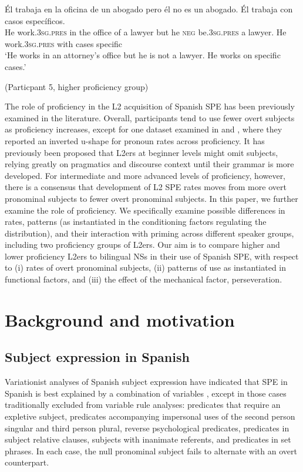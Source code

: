 \documentclass[output=paper,colorlinks,citecolor=brown,draftmode]{langscibook}
\begin{document}
\ea\label{ex:14:3}
\gll Él trabaja en la oficina de un abogado pero él no es un abogado. Él trabaja con casos específicos.\\
     He work.\textsc{3sg}.\textsc{pres} in the office of a lawyer but he \textsc{neg} be.\textsc{3sg}.\textsc{pres} a lawyer. He work.\textsc{3sg}.\textsc{pres} with cases specific\\
\glt ‘He works in an attorney’s office but he is not a lawyer. He works on specific cases.'
\begin{flushright}
(Particpant 5, higher proficiency group)
\end{flushright}
\z
{} %
The role of proficiency in the L2 acquisition of Spanish SPE has been previously examined in the literature. Overall, participants tend to use fewer overt subjects as proficiency increases, except for one dataset examined in \citet{GeeslinFafulas2015} and \citet{GeeslinDíaz-Campos2013}, where they reported an inverted u-shape for pronoun rates across proficiency. It has previously been proposed that L2ers at beginner levels might omit subjects, relying greatly on pragmatics and discourse context until their grammar is more developed. For intermediate and more advanced levels of proficiency, however, there is a consensus that development of L2 SPE rates moves from more overt pronominal subjects to fewer overt pronominal subjects. In this paper, we further examine the role of proficiency. We specifically examine possible differences in rates, patterns (as instantiated in the conditioning factors regulating the distribution), and their interaction with priming across different speaker groups, including two proficiency groups of L2ers. Our aim is to compare higher and lower proficiency L2ers to bilingual NSs in their use of Spanish SPE, with respect to (i) rates of overt pronominal subjects, (ii) patterns of use as instantiated in functional factors, and (iii) the effect of the mechanical factor, perseveration.

\section{Background and motivation}
\subsection{Subject expression in Spanish}
Variationist analyses of Spanish subject expression have indicated that SPE in Spanish is best explained by a combination of variables \citep{CarvalhoShin2015}, except in those cases traditionally excluded from variable rule analyses: predicates that require an expletive subject, predicates accompanying impersonal uses of the second person singular and third person plural, reverse psychological predicates, predicates in subject relative clauses, subjects with inanimate referents, and predicates in set phrases. In each case, the null pronominal subject fails to alternate with an overt counterpart.
\end{document}
